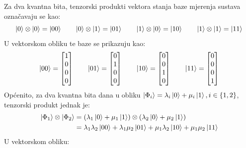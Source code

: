Za dva kvantna bita, tenzorski produkti vektora stanja baze mjerenja sustava označavaju se kao:
\begin{equation}
\ket{0} \otimes \ket{0} = \ket{00} \qquad  \ket{0} \otimes \ket{1} = \ket{01} \qquad \ket{1} \otimes \ket{0} = \ket{10} \qquad \ket{1} \otimes \ket{1} = \ket{11}
\end{equation}
U vektorskom obliku te baze se prikazuju kao:
\begin{equation}
\ket{00} = \begin{bmatrix}
1 \\ 0 \\ 0 \\ 0
\end{bmatrix}
\qquad
\ket{01} = \begin{bmatrix}
0 \\ 1 \\ 0 \\ 0
\end{bmatrix}
\qquad
\ket{10} = \begin{bmatrix}
0 \\ 0 \\ 1 \\ 0
\end{bmatrix}
\qquad
\ket{11} = \begin{bmatrix}
0 \\ 0 \\ 0 \\ 1
\end{bmatrix}
\end{equation}
Općenito, za dva kvantna bita dana u obliku $\ket{\Phi_i} = \lambda_i\ket{0} + \mu_i\ket{1}, i \in \{1, 2\}$, tenzorski produkt jednak je:
\begin{align}
\begin{split}
\ket{\Phi_1} \otimes \ket{\Phi_2} &= (\lambda_1\ket{0} + \mu_1\ket{1}) \otimes (\lambda_2\ket{0} + \mu_2\ket{1})
\\
&= \lambda_1\lambda_2\ket{00} + \lambda_1\mu_2\ket{01} + \mu_1\lambda_2\ket{10} + \mu_1\mu_2\ket{11}
\label{eq:tensor2qubits}
\end{split}
\end{align}
U vektorskom obliku:
